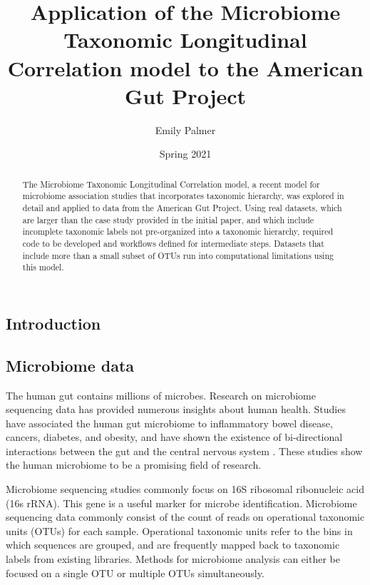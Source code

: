 \documentclass[12pt]{article}
\title{Application of the Microbiome Taxonomic Longitudinal Correlation model to the American Gut Project}
\author{Emily Palmer}
\date{Spring 2021}
\begin{document}
\begin{singlespace}
\maketitle
\end{singlespace}
\begin{abstract}
  The Microbiome Taxonomic Longitudinal Correlation model, a recent model for microbiome association studies that incorporates taxonomic hierarchy, was explored in detail and applied to data from the American Gut Project.
  Using real datasets, which are larger than the case study provided in the initial paper, and which include incomplete taxonomic labels not pre-organized into a taxonomic hierarchy, required code to be developed and workflows defined for intermediate steps. Datasets that include more than a small subset of OTUs run into computational limitations using this model.
\end{abstract}


\begin{singlespace}
\section{Introduction}
\end{singlespace}

\subsection{Microbiome data}
The human gut contains millions of microbes. Research on microbiome sequencing data has provided numerous insights about human health. Studies have associated the human gut microbiome to inflammatory bowel disease, cancers, diabetes, and obesity, and have shown the existence of bi-directional interactions between the gut and the central nervous system \cite{kinross2008human, mayer2015gut}. These studies show the human microbiome to be a promising field of research.


Microbiome sequencing studies commonly focus on 16S ribosomal ribonucleic acid (16s rRNA). This gene is a useful marker for microbe identification. Microbiome sequencing data commonly consist of the count of reads on operational taxonomic units (OTUs) for each sample. Operational taxonomic units refer to the bins in which sequences are grouped, and are frequently mapped back to taxonomic labels from existing libraries. Methods for microbiome analysis can either be focused on a single OTU or multiple OTUs simultaneously.
\end{document}
